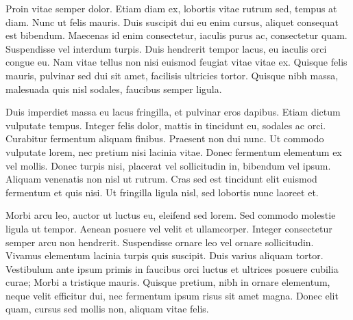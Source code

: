 \documentclass[english,aps,prd,nofootinbib,twocolumn]{revtex4-1}
\begin{document}
Proin vitae semper dolor. Etiam diam ex, lobortis vitae rutrum sed, tempus at diam. Nunc ut felis mauris. Duis suscipit dui eu enim cursus, aliquet consequat est bibendum. Maecenas id enim consectetur, iaculis purus ac, consectetur quam. Suspendisse vel interdum turpis. Duis hendrerit tempor lacus, eu iaculis orci congue eu. Nam vitae tellus non nisi euismod feugiat vitae vitae ex. Quisque felis mauris, pulvinar sed dui sit amet, facilisis ultricies tortor. Quisque nibh massa, malesuada quis nisl sodales, faucibus semper ligula.

Duis imperdiet massa eu lacus fringilla, et pulvinar eros dapibus. Etiam dictum vulputate tempus. Integer felis dolor, mattis in tincidunt eu, sodales ac orci. Curabitur fermentum aliquam finibus. Praesent non dui nunc. Ut commodo vulputate lorem, nec pretium nisi lacinia vitae. Donec fermentum elementum ex vel mollis. Donec turpis nisi, placerat vel sollicitudin in, bibendum vel ipsum. Aliquam venenatis non nisl ut rutrum. Cras sed est tincidunt elit euismod fermentum et quis nisi. Ut fringilla ligula nisl, sed lobortis nunc laoreet et.

Morbi arcu leo, auctor ut luctus eu, eleifend sed lorem. Sed commodo molestie ligula ut tempor. Aenean posuere vel velit et ullamcorper. Integer consectetur semper arcu non hendrerit. Suspendisse ornare leo vel ornare sollicitudin. Vivamus elementum lacinia turpis quis suscipit. Duis varius aliquam tortor. Vestibulum ante ipsum primis in faucibus orci luctus et ultrices posuere cubilia curae; Morbi a tristique mauris. Quisque pretium, nibh in ornare elementum, neque velit efficitur dui, nec fermentum ipsum risus sit amet magna. Donec elit quam, cursus sed mollis non, aliquam vitae felis.
\end{document}
